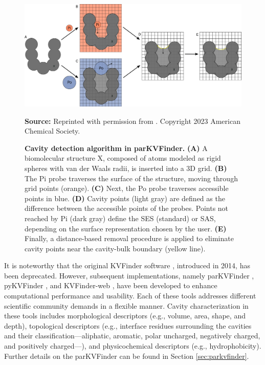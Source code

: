 \documentclass[Ingles]{phdthesis}
\def\eg{e.g.\onedot}
\begin{document}
\begin{figure}[h]
  \centerline{\includegraphics[scale=1]{images/kvfinder-suite-schema.png}}
  \centerline{\tiny{\textbf{Source:} Reprinted with permission from \cite{guerra2023B}. Copyright 2023 American Chemical Society.}}
  \caption[Cavity detection algorithm in parKVFinder]{\textbf{Cavity detection algorithm in parKVFinder.} \textbf{(A)} A biomolecular structure X, composed of atoms modeled as rigid spheres with van der Waals radii, is inserted into a \acs{3D} grid. \textbf{(B)} The \ac{Pi} probe traverses the surface of the structure, moving through grid points (orange). \textbf{(C)} Next, the \ac{Po} probe traverses accessible points in blue. \textbf{(D)} Cavity points (light gray) are defined as the difference between the accessible points of the probes. Points not reached by \acs{Pi} (dark gray) define the \acs{SES} (standard) or \acs{SAS}, depending on the surface representation chosen by the user. \textbf{(E)} Finally, a distance-based removal procedure is applied to eliminate cavity points near the cavity-bulk boundary (yellow line).}
  \label{fig:parkvfinder-schema}
\end{figure}

It is noteworthy that the original KVFinder software \cite{oliveira2014}, introduced in 2014, has been deprecated. However, subsequent implementations, namely parKVFinder \cite{guerra2020}, pyKVFinder \cite{guerra2021}, and KVFinder-web \cite{guerra2023A}, have been developed to enhance computational performance and usability. Each of these tools addresses different scientific community demands in a flexible manner. Cavity characterization in these tools includes morphological descriptors (\eg, volume, area, shape, and depth), topological descriptors (\eg, interface residues surrounding the cavities and their classification---aliphatic, aromatic, polar uncharged, negatively charged, and positively charged---), and physicochemical descriptors (\eg, hydrophobicity). Further details on the parKVFinder can be found in Section \ref{sec:parkvfinder}.
\end{document}
